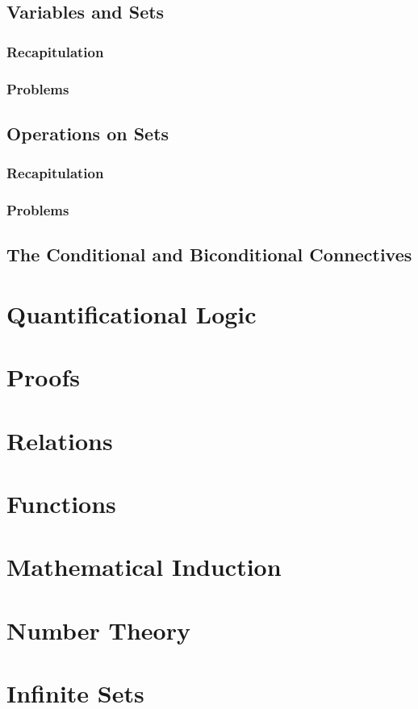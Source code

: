 \documentclass{report}
\begin{document}
    \section{Variables and Sets}
        \subsection{Recapitulation}
        
        \subsection{Problems}
        
    \section{Operations on Sets}
        \subsection{Recapitulation}
        
        \subsection{Problems}
        
    \section{The Conditional and Biconditional Connectives}

\chapter{Quantificational Logic}
\chapter{Proofs}
\chapter{Relations}
\chapter{Functions}
\chapter{Mathematical Induction}
\chapter{Number Theory}
\chapter{Infinite Sets}
\end{document}
